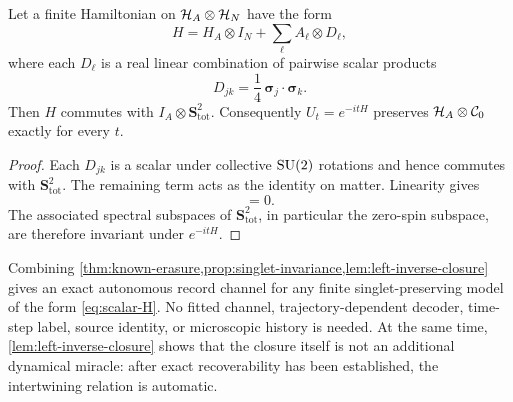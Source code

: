 \begin{proposition}
\label{prop:singlet-invariance}
Let a finite Hamiltonian on $\mathcal H_A\otimes\mathcal H_N$ have the form
\begin{equation}
  H=H_A\otimes I_N+\sum_\ell A_\ell\otimes D_\ell,
  \label{eq:scalar-H}
\end{equation}
where each $D_\ell$ is a real linear combination of pairwise scalar products
\begin{equation}
  D_{jk}=\frac14\,\boldsymbol\sigma_j\cdot\boldsymbol\sigma_k.
\end{equation}
Then $H$ commutes with $I_A\otimes\mathbf S_{\mathrm{tot}}^2$.  Consequently $U_t=e^{-itH}$ preserves $\mathcal H_A\otimes\mathcal C_0$ exactly for every $t$.
\end{proposition}

\begin{proof}
Each $D_{jk}$ is a scalar under collective $\mathrm{SU}(2)$ rotations and hence commutes with $\mathbf S_{\mathrm{tot}}^2$.  The remaining term acts as the identity on matter.  Linearity gives
\begin{equation}
  [H,I_A\otimes\mathbf S_{\mathrm{tot}}^2]=0.
\end{equation}
The associated spectral subspaces of $\mathbf S_{\mathrm{tot}}^2$, in particular the zero-spin subspace, are therefore invariant under $e^{-itH}$.
\end{proof}

Combining \cref{thm:known-erasure,prop:singlet-invariance,lem:left-inverse-closure} gives an exact autonomous record channel for any finite singlet-preserving model of the form \cref{eq:scalar-H}.  No fitted channel, trajectory-dependent decoder, time-step label, source identity, or microscopic history is needed.  At the same time, \cref{lem:left-inverse-closure} shows that the closure itself is not an additional dynamical miracle: after exact recoverability has been established, the intertwining relation is automatic.
